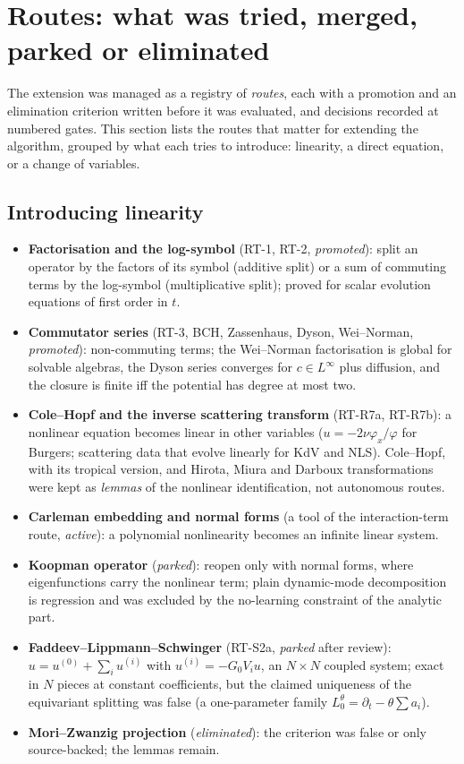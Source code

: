 \section{Routes: what was tried, merged, parked or eliminated}\label{sec:routes}
The extension was managed as a registry of \emph{routes}, each with a promotion and an elimination criterion written before it was evaluated, and decisions recorded at numbered gates. This section lists the routes that matter for extending the algorithm, grouped by what each tries to introduce: linearity, a direct equation, or a change of variables.

\subsection{Introducing linearity}
\begin{itemize}
\item \textbf{Factorisation and the log-symbol} (RT-1, RT-2, \emph{promoted}): split an operator by the factors of its symbol (additive split) or a sum of commuting terms by the log-symbol (multiplicative split); proved for scalar evolution equations of first order in $t$.
\item \textbf{Commutator series} (RT-3, BCH, Zassenhaus, Dyson, Wei--Norman, \emph{promoted}): non-commuting terms; the Wei--Norman factorisation is global for solvable algebras, the Dyson series converges for $c\in L^\infty$ plus diffusion, and the closure is finite iff the potential has degree at most two.
\item \textbf{Cole--Hopf and the inverse scattering transform} (RT-R7a, RT-R7b): a nonlinear equation becomes linear in other variables ($u=-2\nu\varphi_x/\varphi$ for Burgers; scattering data that evolve linearly for KdV and NLS). Cole--Hopf, with its tropical version, and Hirota, Miura and Darboux transformations were kept as \emph{lemmas} of the nonlinear identification, not autonomous routes.
\item \textbf{Carleman embedding and normal forms} (a tool of the interaction-term route, \emph{active}): a polynomial nonlinearity becomes an infinite linear system.
\item \textbf{Koopman operator} (\emph{parked}): reopen only with normal forms, where eigenfunctions carry the nonlinear term; plain dynamic-mode decomposition is regression and was excluded by the no-learning constraint of the analytic part.
\item \textbf{Faddeev--Lippmann--Schwinger} (RT-S2a, \emph{parked} after review): $u=u^{(0)}+\sum_iu^{(i)}$ with $u^{(i)}=-G_0V_iu$, an $N\times N$ coupled system; exact in $N$ pieces at constant coefficients, but the claimed uniqueness of the equivariant splitting was false (a one-parameter family $L_0^\theta=\partial_t-\theta\sum a_i$).
\item \textbf{Mori--Zwanzig projection} (\emph{eliminated}): the criterion was false or only source-backed; the lemmas remain.
\end{itemize}

